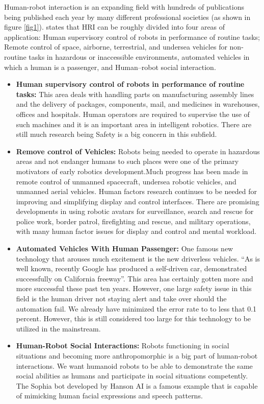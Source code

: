 \documentclass[conference]{IEEEtran}
\begin{document}
Human-robot interaction is an expanding field with hundreds of publications being published each year by many different professional societies (as shown in figure \ref{fig1}). \textcite{sheridan2016human} states that HRI can be roughly divided into four areas of application: Human supervisory control of robots in performance of routine tasks; Remote control of space, airborne, terrestrial, and undersea vehicles for non-routine tasks in hazardous or inaccessible environments, automated vehicles in which a human is a passenger, and Human–robot social interaction. 
\begin{itemize}
\item \textbf{Human supervisory control of robots in performance of routine tasks:} This area deals with handling parts on manufacturing assembly lines and the delivery of packages, components, mail, and medicines in warehouses, offices and hospitals\autocite{sheridan2016human}. Human operators are required to supervise the use of such machines and it is an important area in intelligent robotics. There are still much research being Safety is a big concern in this subfield.
\item \textbf{Remove control of Vehicles:} Robots being needed to operate in hazardous areas and not endanger humans to such places were one of the primary motivators of early robotics development.Much progress has been made in remote control of unmanned spacecraft, undersea robotic vehicles, and unmanned aerial vehicles. Human factors research continues to be needed for improving and simplifying display and control interfaces\autocite{sheridan2016human}. There are promising developments in using robotic avatars for surveillance, search and rescue for police work, border patrol, firefighting and rescue, and military operations, with many human factor issues for display and control and mental workload\autocite{sheridan2016human}.
\item \textbf{Automated Vehicles With Human Passenger:} One famous new technology that arouses much excitement is the new driverless vehicles. ``As is well known, recently Google has produced a self-driven car, demonstrated successfully on California freeway''\autocite{sheridan2016human}. This area has certainly gotten more and more successful these past ten years. However, one large safety issue in this field is the human driver not staying alert and take over should the automation fail. We already have minimized the error rate to to less that 0.1 percent. However, this is still considered too large for this technology to be utilized in the mainstream.
\item \textbf{Human-Robot Social Interactions:} Robots functioning in social situations and becoming more anthropomorphic is a big part of human-robot interactions. We want humanoid robots to be able to demonstrate the same social abilities as humans and participate in social situations competently. The Sophia bot developed by Hanson AI is a famous example that is capable of mimicking human facial expressions and speech patterns.
\end{itemize}
\end{document}
